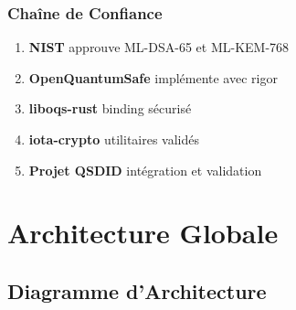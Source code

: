 \documentclass[12pt,a4paper]{report}
\begin{document}
\subsection{Chaîne de Confiance}

\begin{enumerate}
  \item \textbf{NIST} approuve ML-DSA-65 et ML-KEM-768
  \item \textbf{OpenQuantumSafe} implémente avec rigor
  \item \textbf{liboqs-rust} binding sécurisé
  \item \textbf{iota-crypto} utilitaires validés
  \item \textbf{Projet QSDID} intégration et validation
\end{enumerate}

\chapter{Architecture Globale}

\section{Diagramme d'Architecture}
\end{document}
